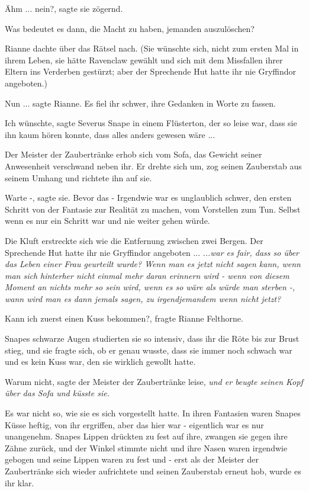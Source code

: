 \glqq{}Ähm ... nein?\grqq{}, sagte sie zögernd.

\glqq{}Was bedeutet es dann, die Macht zu haben, jemanden auszulöschen?\grqq{}

Rianne dachte über das Rätsel nach. (Sie wünschte sich, nicht zum ersten Mal in
ihrem Leben, sie hätte Ravenclaw gewählt und sich mit dem Missfallen ihrer
Eltern ins Verderben gestürzt; aber der Sprechende Hut hatte ihr nie Gryffindor
angeboten.)

\glqq{}Nun ...\grqq{} sagte Rianne. Es fiel ihr schwer, ihre Gedanken in Worte zu
fassen.\grqq{}

\glqq{}Ich wünschte\grqq{}, sagte Severus Snape in einem Flüsterton, der so leise
war, dass sie ihn kaum hören konnte, \glqq{}dass alles anders gewesen wäre
...\grqq{}

Der Meister der Zaubertränke erhob sich vom Sofa, das Gewicht seiner Anwesenheit
verschwand neben ihr. Er drehte sich um, zog seinen Zauberstab aus seinem Umhang
und richtete ihn auf sie.

\glqq{}Warte -\grqq{}, sagte sie. \glqq{}Bevor das -\grqq{} Irgendwie war es
unglaublich schwer, den ersten Schritt von der Fantasie zur Realität zu machen,
vom Vorstellen zum Tun. Selbst wenn es nur ein Schritt war und nie weiter gehen
würde.

Die Kluft erstreckte sich wie die Entfernung zwischen zwei Bergen. Der
Sprechende Hut hatte ihr nie Gryffindor angeboten ... .\emph{..war es fair, dass
so über das Leben einer Frau geurteilt wurde? Wenn man es jetzt nicht sagen
kann, wenn man sich hinterher nicht einmal mehr daran erinnern wird - wenn von
diesem Moment an nichts mehr so sein wird, wenn es so wäre als würde man sterben
-, wann wird man es dann jemals sagen, zu irgendjemandem wenn nicht jetzt?}

\glqq{}Kann ich zuerst einen Kuss bekommen?\grqq{}, fragte Rianne Felthorne.

Snapes schwarze Augen studierten sie so intensiv, dass ihr die Röte bis zur
Brust stieg, und sie fragte sich, ob er genau wusste, dass sie immer noch
schwach war und es kein Kuss war, den sie wirklich gewollt hatte.

\glqq{}Warum nicht\grqq{}, sagte der Meister der Zaubertränke leise, \emph{und er
beugte seinen Kopf über das Sofa und küsste sie.}

Es war nicht so, wie sie es sich vorgestellt hatte. In ihren Fantasien waren
Snapes Küsse heftig, von ihr ergriffen, aber das hier war - eigentlich war es
nur unangenehm. Snapes Lippen drückten zu fest auf ihre, zwangen sie gegen ihre
Zähne zurück, und der Winkel stimmte nicht und ihre Nasen waren irgendwie
gebogen und seine Lippen waren zu fest und - erst als der Meister der
Zaubertränke sich wieder aufrichtete und seinen Zauberstab erneut hob, wurde es
ihr klar.

